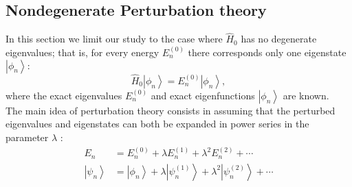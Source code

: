 \subsection{Nondegenerate Perturbation theory}
In this section we limit our study to the case where $\hat{H}_{0}$ has no degenerate eigenvalues; that is, for every energy $E_{n}^{(0)}$ there corresponds only one eigenstate $\left|\phi_{n}\right\rangle:$
$$
\hat{H}_{0}\left|\phi_{n}\right\rangle=E_{n}^{(0)}\left|\phi_{n}\right\rangle,
$$
where the exact eigenvalues $E_{n}^{(0)}$ and exact eigenfunctions $\left|\phi_{n}\right\rangle$ are known.\\

The main idea of perturbation theory consists in assuming that the perturbed eigenvalues and eigenstates can both be expanded in power series in the parameter $\lambda$ :
$$
\begin{aligned}
E_{n} &=E_{n}^{(0)}+\lambda E_{n}^{(1)}+\lambda^{2} E_{n}^{(2)}+\cdots \\
\left|\psi_{n}\right\rangle &=\left|\phi_{n}\right\rangle+\lambda\left|\psi_{n}^{(1)}\right\rangle+\lambda^{2}\left|\psi_{n}^{(2)}\right\rangle+\cdots
\end{aligned}
$$

